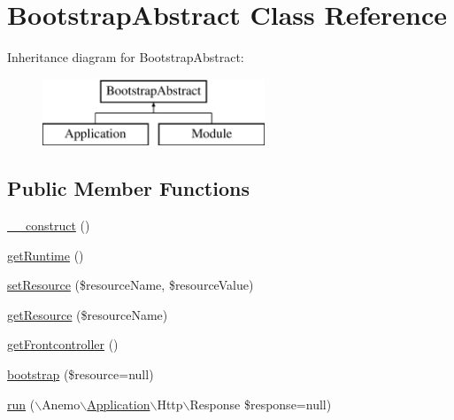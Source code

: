 \hypertarget{class_anemo_1_1_application_1_1_bootstrap_1_1_bootstrap_abstract}{
\section{BootstrapAbstract Class Reference}
\label{class_anemo_1_1_application_1_1_bootstrap_1_1_bootstrap_abstract}
}
Inheritance diagram for BootstrapAbstract:\begin{figure}[H]
\begin{center}
\leavevmode
\includegraphics[height=2.000000cm]{class_anemo_1_1_application_1_1_bootstrap_1_1_bootstrap_abstract}
\end{center}
\end{figure}
\subsection*{Public Member Functions}
\begin{DoxyCompactItemize}
\item 
\hyperlink{class_anemo_1_1_application_1_1_bootstrap_1_1_bootstrap_abstract_a095c5d389db211932136b53f25f39685}{\_\-\_\-construct} ()
\item 
\hyperlink{class_anemo_1_1_application_1_1_bootstrap_1_1_bootstrap_abstract_ac2a09455b573392d15b9c869c0a3bf72}{getRuntime} ()
\item 
\hyperlink{class_anemo_1_1_application_1_1_bootstrap_1_1_bootstrap_abstract_ae35d77763195c088f5a6bf80868cd946}{setResource} (\$resourceName, \$resourceValue)
\item 
\hyperlink{class_anemo_1_1_application_1_1_bootstrap_1_1_bootstrap_abstract_a30b3fff81c5977a430f38403557b883b}{getResource} (\$resourceName)
\item 
\hyperlink{class_anemo_1_1_application_1_1_bootstrap_1_1_bootstrap_abstract_aa182525e446da02ad9af5d903f3f8f66}{getFrontcontroller} ()
\item 
\hyperlink{class_anemo_1_1_application_1_1_bootstrap_1_1_bootstrap_abstract_ad15ef0757b73cb8080b00b3b0a96e092}{bootstrap} (\$resource=null)
\item 
\hyperlink{class_anemo_1_1_application_1_1_bootstrap_1_1_bootstrap_abstract_aacbe5cfc1af0f6e016aef87bc23a61e2}{run} ($\backslash$Anemo$\backslash$\hyperlink{class_anemo_1_1_application}{Application}$\backslash$Http$\backslash$Response \$response=null)
\end{DoxyCompactItemize}
